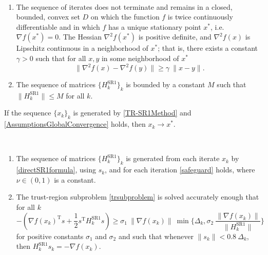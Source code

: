 \begin{assumption}\label{AssumptionsGlobalConvergence} \ \\[-1.5\baselineskip]
    \begin{enumerate}
        \item The sequence of iterates does not terminate and remains in a closed, bounded, convex set $D$ on which the function $f$ is twice continuously differentiable and in which $f$ has a unique stationary point $x^*$, i.e. $\nabla f(x^*) = 0$. The Hessian $\nabla^2 f(x^*)$ is positive definite, and $\nabla^2 f(x)$ is Lipschitz continuous in a neighborhood of $x^*$; that is, there exists a constant $\gamma > 0$ such that for all $x, y$ in some neighborhood of $x^*$ \begin{equation*} \lVert \nabla^2 f(x) - \nabla^2 f(y) \rVert \geq \gamma \ \lVert x - y \rVert. \end{equation*}
        \item The sequence of matrices $\{ H^{\mathrm{SR1}}_k \}_k$ is bounded by a constant $M$ such that $\lVert H^{\mathrm{SR1}}_k \rVert \leq M$ for all $k$.
    \end{enumerate}
\end{assumption}

\begin{theorem} \label{GlobalConvergence}
    If the sequence $\{ x_k \}_k$ is generated by \cref{TR-SR1Method} and \cref{AssumptionsGlobalConvergence} holds, then $x_k \rightarrow x^*$.
\end{theorem}

\begin{assumption}\label{AssumptionsLocalConvergence} \ \\[-1.5\baselineskip]
    \begin{enumerate}
        \item The sequence of matrices $\{ H^{\mathrm{SR1}}_k \}_k$ is generated from each iterate $x_k$ by \cref{directSR1formula}, using $s_k$, and for each iteration \cref{safeguard} holds, where $\nu \in (0, 1)$ is a constant.
        \item The trust-region subproblem \cref{trsubproblem} is solved accurately enough that for all $k$ \begin{equation*} -(\nabla f(x_k)^{\mathrm{T}} s + \frac{1}{2} s^{\mathrm{T}} H^{\mathrm{SR1}}_k s) \geq \sigma_1 \ \lVert \nabla f(x_k) \rVert \ \min \{ \Delta_k, \sigma_2 \ \frac{\lVert \nabla f(x_k) \rVert}{\lVert H^{\mathrm{SR1}}_k \rVert} \} \end{equation*} for positive constants $\sigma_1$ and $\sigma_2$ and such that whenever $\lVert s_k \rVert < 0.8 \ \Delta_k$, then $H^{\mathrm{SR1}}_k s_k = - \nabla f(x_k)$.
    \end{enumerate}
\end{assumption}


